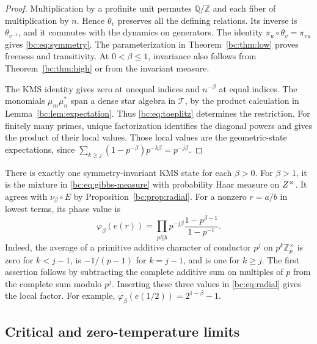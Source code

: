 \begin{proof}
Multiplication by a profinite unit permutes \(\mathbb Q/\mathbb Z\)
and each fiber of multiplication by \(n\). Hence \(\theta_v\)
preserves all the defining relations. Its inverse is
\(\theta_{v^{-1}}\), and it commutes with the dynamics on generators.
The identity \(\pi_u\circ\theta_v=\pi_{vu}\) gives
\eqref{bc:eq:symmetry}. The parameterization in
Theorem~\ref{bc:thm:low} proves freeness and transitivity.
At \(0<\beta\leq1\), invariance also follows from
Theorem~\ref{bc:thm:high} or from the invariant measure.

The KMS identity gives zero at unequal indices and \(n^{-\beta}\)
at equal indices. The monomials \(\mu_m\mu_n^*\) span a dense star
algebra in \(\mathcal T\), by the product calculation in
Lemma~\ref{bc:lem:expectation}. Thus \eqref{bc:eq:toeplitz} determines the
restriction. For finitely many primes, unique factorization identifies
the diagonal powers and gives the product of their local values.
Those local values are the geometric-state expectations, since
\(\sum_{k\geq j}(1-p^{-\beta})p^{-k\beta}=p^{-j\beta}\).
\end{proof}

There is exactly one symmetry-invariant KMS state for each \(\beta>0\).
For \(\beta>1\), it is the mixture in \eqref{bc:eq:gibbs-measure} with
probability Haar measure on \(Z^{\times}\). It agrees with
\(\nu_\beta\circ E\) by Proposition~\ref{bc:prop:radial}.
For a nonzero \(r=a/b\) in lowest terms, its phase value is
\begin{equation}\label{bc:eq:phase-value}
 \varphi_\beta(e(r))
   =\prod_{p^j\Vert b}
         p^{-j\beta}\frac{1-p^{\beta-1}}{1-p^{-1}}.
\end{equation}
Indeed, the average of a primitive additive character of conductor
\(p^j\) on \(p^k\mathbb Z_p^\times\) is zero for \(k<j-1\),
is \(-1/(p-1)\) for \(k=j-1\), and is one for \(k\geq j\).
The first assertion follows by subtracting the complete additive sum
on multiples of \(p\) from the complete sum modulo \(p^j\).
Inserting these three values in \eqref{bc:eq:radial} gives the local factor.
For example, \(\varphi_\beta(e(1/2))=2^{1-\beta}-1\).

\subsection{Critical and zero-temperature limits}

